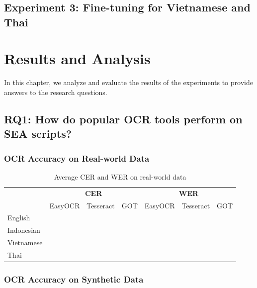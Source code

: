 \documentclass[12pt,oneside]{memoir}
\begin{document}
\section{Experiment 3: Fine-tuning for Vietnamese and Thai} \label{section:experiment-3}

\chapter{Results and Analysis}

In this chapter, we analyze and evaluate the results of the experiments to provide answers to the research questions.

\section{RQ1: How do popular OCR tools perform on SEA scripts?}

\subsection{OCR Accuracy on Real-world Data}

\begin{table}[ht]
    \centering
    \caption{Average CER and WER on real-world data}
    \label{table:ocr-accuracy-on-real-world-data}
    \begin{tabular}{lcccccc}
        \toprule
        & \multicolumn{3}{c}{\textbf{CER}} & \multicolumn{3}{c}{\textbf{WER}}\\
        \cmidrule(lr){2-4}\cmidrule(lr){5-7}
        & EasyOCR & Tesseract & GOT & EasyOCR & Tesseract & GOT\\
        \midrule
        English & \\
        \midrule
        Indonesian & \\
        Vietnamese & \\
        Thai & \\
        \bottomrule
    \end{tabular}
\end{table}

\subsection{OCR Accuracy on Synthetic Data}
\end{document}
